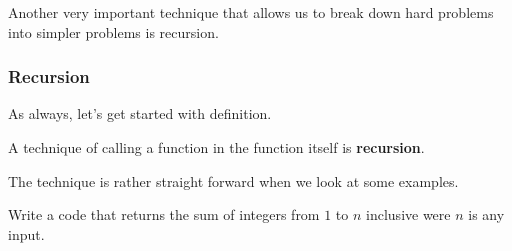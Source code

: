 \documentclass[../../../main.tex]{subfiles}
\begin{document}
Another very important technique that allows us to break down hard
problems into simpler problems is recursion.

\subsubsection{Recursion}

As always, let's get started with definition.

\begin{definition}{}{}
A technique of calling a function in the function itself is
\textbf{recursion}.
\end{definition}

The technique is rather straight forward when we look at some
examples.

\begin{problem}{}{}
Write a code that returns the sum of integers from $1$ to $n$
inclusive were $n$ is any input.
\end{problem}
\end{document}
